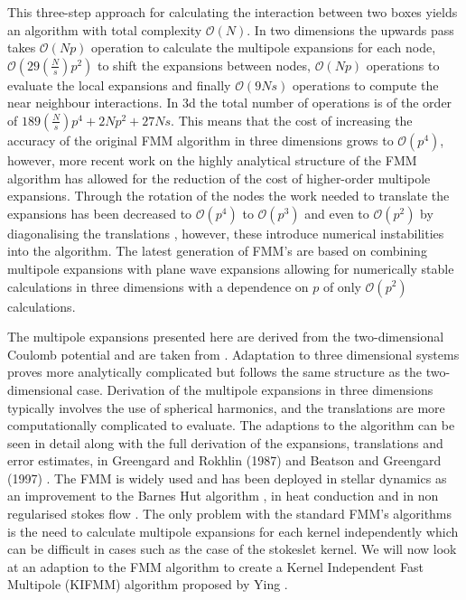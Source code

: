 This three-step approach for calculating the interaction between two boxes yields an algorithm with total complexity $\mathcal{O}(N)$. In two dimensions the upwards pass takes $\mathcal{O}(Np)$ operation to calculate the multipole expansions for each node, $\mathcal{O}(29 \left(\frac{N}{s}\right) p^2)$ to shift the expansions between nodes, $\mathcal{O}(Np)$ operations to evaluate the local expansions and finally $\mathcal{O}(9Ns)$ operations to compute the near neighbour interactions. In 3d the total number of operations is of the order of $189\left(\frac{N}{s}\right)p^4 + 2Np^2 + 27Ns$. This means that the cost of increasing the accuracy of the original FMM algorithm in three dimensions grows to $\mathcal{O}(p^4)$, however, more recent work on the highly analytical structure of the FMM algorithm has allowed for the reduction of the cost of higher-order multipole expansions. Through the rotation of the nodes the work needed to translate the expansions has been decreased to $\mathcal{O}(p^4)$ to $\mathcal{O}(p^3)$ \cite{Greengard1997ADimensions,Hrycak1998AnFields} and even to $\mathcal{O}(p^2)$ by diagonalising the translations \cite{Berman2006Grid-MultipoleCalculations,Elliott1996FastAlgorithm}, however, these introduce numerical instabilities into the algorithm. The latest generation of FMM's are based on combining multipole expansions with plane wave expansions \cite{Greengard1997ADimensions,Hrycak1998AnFields} allowing for numerically stable calculations in three dimensions with a dependence on $p$ of only $\mathcal{O}(p^2)$ calculations. 

The multipole expansions presented here are derived from the two-dimensional Coulomb potential and are taken from \cite{Beatson,Greengard1987ASimulations}. Adaptation to three dimensional systems proves more analytically complicated but follows the same structure as the two-dimensional case. Derivation of the multipole expansions in three dimensions typically involves the use of spherical harmonics, and the translations are more computationally complicated to evaluate. The adaptions to the algorithm can be seen in detail along with the full derivation of the expansions, translations and error estimates, in Greengard and Rokhlin (1987) \cite{Greengard1987ASimulations} and Beatson and Greengard (1997) \cite{Beatson}. The FMM is widely used and has been deployed in stellar dynamics as an improvement to the Barnes Hut algorithm \cite{Dehnen2014ADynamics}, in heat conduction \cite{Watschinger2021AEquation} and in non regularised stokes flow \cite{Selmi2007FastComplexity,Tornberg2008}. The only problem with the standard FMM's algorithms is the need to calculate multipole expansions for each kernel independently which can be difficult in cases such as the case of the stokeslet kernel. We will now look at an adaption to the FMM algorithm to create a Kernel Independent Fast Multipole (KIFMM) algorithm proposed by Ying \cite{Ying2004,Ying2005}.